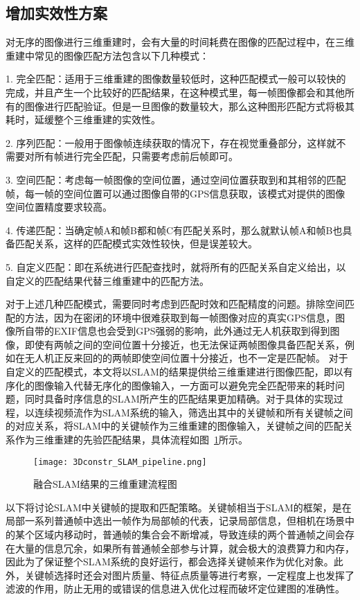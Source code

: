 \subsection{增加实效性方案}
\label{sec:3.3.2}对无序的图像进行三维重建时，会有大量的时间耗费在图像的匹配过程中，在三维重建中常见的图像匹配方法包含以下几种模式：

1. 完全匹配：适用于三维重建的图像数量较低时，这种匹配模式一般可以较快的完成，并且产生一个比较好的匹配结果，在这种模式里，每一帧图像都会和其他所有的图像进行匹配验证。但是一旦图像的数量较大，那么这种图形匹配方式将极其耗时，延缓整个三维重建的实效性。

2. 序列匹配：一般用于图像帧连续获取的情况下，存在视觉重叠部分，这样就不需要对所有帧进行完全匹配，只需要考虑前后帧即可。

3. 空间匹配：考虑每一帧图像的空间位置，通过空间位置获取到和其相邻的匹配帧，每一帧的空间位置可以通过图像自带的GPS信息获取，该模式对提供的图像空间位置精度要求较高。

4. 传递匹配：当确定帧A和帧B都和帧C有匹配关系时，那么就默认帧A和帧B也具备匹配关系，这样的匹配模式实效性较快，但是误差较大。

5. 自定义匹配：即在系统进行匹配查找时，就将所有的匹配关系自定义给出，以自定义的匹配结果代替三维重建中的匹配方法。

对于上述几种匹配模式，需要同时考虑到匹配时效和匹配精度的问题。排除空间匹配的方法，因为在密闭的环境中很难获取到每一帧图像对应的真实GPS信息，图像所自带的EXIF信息也会受到GPS强弱的影响，此外通过无人机获取到得到图像，即使有两帧之间的空间位置十分接近，也无法保证两帧图像具备匹配关系，例如在无人机正反来回的的两帧即使空间位置十分接近，也不一定是匹配帧。
对于自定义的匹配模式，本文将以SLAM的结果提供给三维重建进行图像匹配，即以有序化的图像输入代替无序化的图像输入，一方面可以避免完全匹配带来的耗时问题，同时具备时序信息的SLAM所产生的匹配结果更加精确。对于具体的实现过程，以连续视频流作为SLAM系统的输入，筛选出其中的关键帧和所有关键帧之间的对应关系，将SLAM中的关键帧作为三维重建的图像输入，关键帧之间的匹配关系作为三维重建的先验匹配结果，具体流程如图~\ref{fig:3Dconstr_SLAM_pipeline}所示。
\begin{figure}[t] %
  \centering
  \texttt{[image: 3Dconstr\_SLAM\_pipeline.png]}
  \caption{融合SLAM结果的三维重建流程图}
  \label{fig:3Dconstr_SLAM_pipeline}
\end{figure}
以下将讨论SLAM中关键帧的提取和匹配策略。关键帧相当于SLAM的框架，是在局部一系列普通帧中选出一帧作为局部帧的代表，记录局部信息，但相机在场景中的某个区域内移动时，普通帧的集合会不断增减，导致连续的两个普通帧之间会存在大量的信息冗余，如果所有普通帧全部参与计算，就会极大的浪费算力和内存， 因此为了保证整个SLAM系统的良好运行，都会选择关键帧来作为优化对象。此外，关键帧选择时还会对图片质量、特征点质量等进行考察，一定程度上也发挥了滤波的作用，防止无用的或错误的信息进入优化过程而破坏定位建图的准确性。

